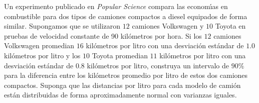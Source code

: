 \begin{enunciado}
 Un experimento publicado en \textit{Popular Science} compara las econom\'{\i}as en combustible para dos tipos de camiones compactos a diesel equipados de forma similar. Supongamos que se utilizaron $12$ camiones Volkswagen y $10$ Toyota en pruebas de velocidad constante de 90 kil\'ometros por hora. Si los $12$ camiones Volkswagen promedian $16$ kil\'ometros por litro con una desviaci\'on est\'andar de $1.0$ kil\'ometros por litro y los $10$ Toyota promedian $11$ kil\'ometros por litro con una desviaci\'on est\'andar de $0.8$ kil\'ometros por litro, construya un intervalo de $90\%$ para la diferencia entre los kil\'ometros promedio por litro de estos dos camiones compactos. Suponga que las distancias por litro para cada modelo de cami\'on est\'an distribuidas de forma aproximadamente normal con varianzas iguales.
\end{enunciado}

